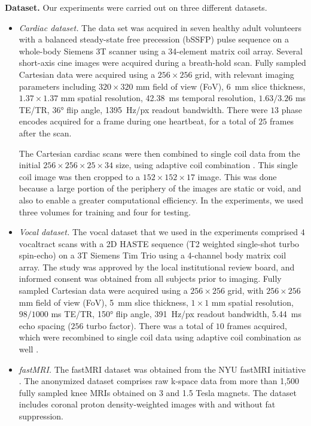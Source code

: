 \textbf{Dataset.} Our experiments were carried out on three different datasets. 
\begin{itemize}
    \item \textit{Cardiac dataset.} The data set was acquired in seven healthy adult volunteers with a balanced steady-state free precession (bSSFP) pulse sequence on a whole-body Siemens 3T scanner using a 34-element matrix coil array. Several short-axis cine images were acquired during a breath-hold scan. Fully sampled Cartesian data were acquired using a $256\times 256$ grid, with relevant imaging parameters including $320 \times 320$ mm field of view (FoV), \SI{6}{\milli\meter} slice thickness, $1.37 \times 1.37$ mm spatial resolution, \SI{42.38}{\milli\second} temporal resolution, $1.63/3.26$ ms TE/TR, \ang{36} flip angle, \SI{1395}{\hertz}\mbox{/px} readout bandwidth. There were $13$ phase encodes acquired for a frame during one heartbeat, for a total of $25$ frames after the scan. 
     
    The Cartesian cardiac scans were then combined to single coil data from the initial $256\times 256 \times 25 \times 34$ size, using adaptive coil combination \citep{walsh2000adaptive, griswold2002use}. This single coil image was then cropped to a $152 \times 152 \times 17$ image. This was done because a large portion of the periphery of the images are static or void, and also to enable a greater computational efficiency. In the experiments, we used three volumes for training and four for testing. 
    
    \item \textit{Vocal dataset.} The vocal dataset that we used in the experiments comprised $4$ vocaltract scans with a 2D HASTE sequence (T2 weighted single-shot turbo spin-echo) on a 3T Siemens Tim Trio using a 4-channel body matrix coil array. The study  was  approved  by  the  local  institutional  review  board,  and  informed  consent  was  obtained  from  all  subjects  prior  to  imaging.  Fully sampled Cartesian data were acquired using a $256 \times 256$ grid, with $256 \times 256$ mm field of view (FoV), \SI{5}{\milli\meter} slice thickness, $1 \times 1$ mm spatial resolution, $98/1000$ ms TE/TR, \ang{150} flip angle,  \SI{391}{\hertz}\mbox{/px} readout bandwidth, \SI{5.44}{\milli\second} echo spacing ($256$ turbo factor). There was a total of $10$ frames acquired, which were recombined to single coil data using adaptive coil combination as well \citep{walsh2000adaptive, griswold2002use}.  
     
    \item \textit{fastMRI.} The fastMRI dataset was obtained from the NYU fastMRI initiative \citep{zbontarFastMRIOpenDataset2019}. The anonymized dataset comprises raw k-space data from more than 1,500 fully sampled knee MRIs obtained on 3 and 1.5 Tesla magnets. The dataset includes coronal proton density-weighted images with and without fat suppression. 
\end{itemize}



